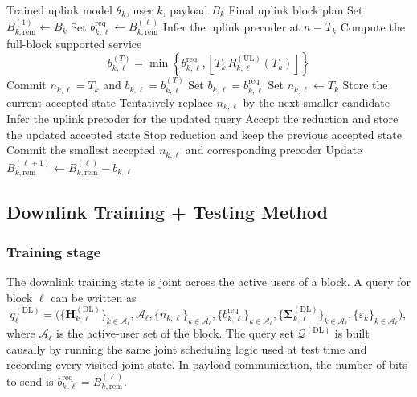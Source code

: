 \documentclass[11pt]{article}
\newcommand{\Aset}{\mathcal{A}}
\newcommand{\Qset}{\mathcal{Q}}
\newcommand{\Hc}{\mathbf{H}}
\newcommand{\Sig}{\mathbf{\Sigma}}
\newcommand{\floor}[1]{\left\lfloor #1 \right\rfloor}
\newcommand{\UL}{\mathrm{UL}}
\newcommand{\DL}{\mathrm{DL}}
\begin{document}
\begin{algorithm}[H]
\caption{Uplink Testing Stage}
\label{alg:ul-test-stage}
\small
\begin{algorithmic}[1]
\Require Trained uplink model $\theta_k$, user $k$, payload $B_k$
\Ensure Final uplink block plan
\State Set $B_{k,\mathrm{rem}}^{(1)} \gets B_k$
    \State Set $b_{k,\ell}^{\mathrm{req}} \gets B_{k,\mathrm{rem}}^{(\ell)}$
    \State Infer the uplink precoder at $n=T_k$
    \State Compute the full-block supported service
    \[
    b_{k,\ell}^{(T)}
    =
    \min\!\left\{
    b_{k,\ell}^{\mathrm{req}},
    \floor{T_k\,R_{k,\ell}^{(\UL)}(T_k)}
    \right\}
    \]
        \State Commit $n_{k,\ell}=T_k$ and $b_{k,\ell}=b_{k,\ell}^{(T)}$
    \Else
        \State Set $b_{k,\ell}=b_{k,\ell}^{\mathrm{req}}$
        \State Set $n_{k,\ell}\gets T_k$
        \State Store the current accepted state
            \State Tentatively replace $n_{k,\ell}$ by the next smaller candidate
            \State Infer the uplink precoder for the updated query
            \If{$\dfrac{b_{k,\ell}}{n_{k,\ell}} \le R_{k,\ell}^{(\UL)}(n_{k,\ell})$ and $P(q_{k,\ell}^{(\UL)},\theta_k)\le P_k$}
                \State Accept the reduction and store the updated accepted state
            \Else
                \State Stop reduction and keep the previous accepted state
            \EndIf
        \EndWhile
        \State Commit the smallest accepted $n_{k,\ell}$ and corresponding precoder
    \EndIf
    \State Update $B_{k,\mathrm{rem}}^{(\ell+1)} \gets B_{k,\mathrm{rem}}^{(\ell)} - b_{k,\ell}$
\EndFor
\end{algorithmic}
\end{algorithm}

\subsection{Downlink Training + Testing Method}

\subsubsection{Training stage}

The downlink training state is joint across the active users of a block. A
query for block $\ell$ can be written as
\begin{equation}
q_{\ell}^{(\DL)}
=
\bigl(
\{\Hc_{k,\ell}^{(\DL)}\}_{k\in\Aset_\ell},
\Aset_\ell,
\{n_{k,\ell}\}_{k\in\Aset_\ell},
\{b_{k,\ell}^{\mathrm{req}}\}_{k\in\Aset_\ell},
\{\Sig_{k,\ell}^{(\DL)}\}_{k\in\Aset_\ell},
\{\varepsilon_k\}_{k\in\Aset_\ell}
\bigr),
\label{eq:dl-query}
\end{equation}
where $\Aset_\ell$ is the active-user set of the block. The query set
$\Qset^{(\DL)}$ is built causally by running the same joint scheduling logic
used at test time and recording every visited joint state. In payload
communication, the number of bits to send is
$b_{k,\ell}^{\mathrm{req}} = B_{k,\mathrm{rem}}^{(\ell)}$.
\end{document}
